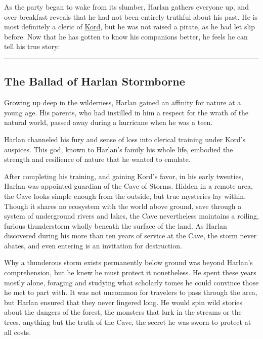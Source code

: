 \documentclass[smalldemyvopaper,11pt,twoside,onecolumn,openright,extrafontsizes]{memoir}
\begin{document}
As the party began to wake from its slumber, Harlan gathers everyone up,
and over breakfast reveals that he had not been entirely truthful about
his past. He is most definitely a cleric of
\href{/characters/kord/}{Kord}, but he was not raised a pirate, as he
had let slip before. Now that he has gotten to know his companions
better, he feels he can tell his true story:

\begin{center}\rule{0.5\linewidth}{\linethickness}\end{center}

\hypertarget{the-ballad-of-harlan-stormborne}{%
\subsection{The Ballad of Harlan
Stormborne}\label{the-ballad-of-harlan-stormborne}}

Growing up deep in the wilderness, Harlan gained an affinity for nature
at a young age. His parents, who had instilled in him a respect for the
wrath of the natural world, passed away during a hurricane when he was a
teen.

Harlan channeled his fury and sense of loss into clerical training under
Kord's auspices. This god, known to Harlan's family his whole life,
embodied the strength and resilience of nature that he wanted to
emulate.

After completing his training, and gaining Kord's favor, in his early
twenties, Harlan was appointed guardian of the Cave of Storms. Hidden in
a remote area, the Cave looks simple enough from the outside, but true
mysteries lay within. Though it shares no ecosystem with the world above
ground, save through a system of underground rivers and lakes, the Cave
nevertheless maintains a roiling, furious thunderstorm wholly beneath
the surface of the land. As Harlan discovered during his more than ten
years of service at the Cave, the storm never abates, and even entering
is an invitation for destruction.

Why a thunderous storm exists permanently below ground was beyond
Harlan's comprehension, but he knew he must protect it nonetheless. He
spent these years mostly alone, foraging and studying what scholarly
tomes he could convince those he met to part with. It was not uncommon
for travelers to pass through the area, but Harlan ensured that they
never lingered long. He would spin wild stories about the dangers of the
forest, the monsters that lurk in the streams or the trees, anything but
the truth of the Cave, the secret he was sworn to protect at all costs.
\end{document}
